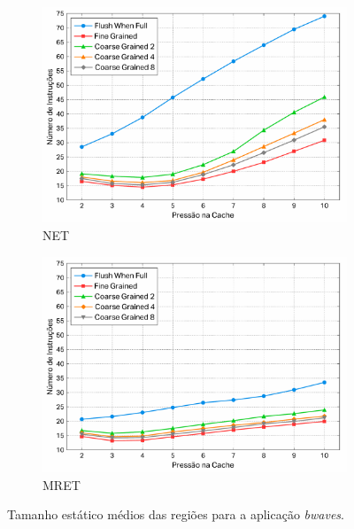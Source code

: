 \documentclass[12pt,twoside]{article}
\begin{document}
\begin{figure}[!ht]
        \centering
        \begin{subfigure}[b]{0.45\textwidth}
                \includegraphics[width=\textwidth]{./figs/net-bwaves-average-reg-size}
                \caption{NET}
                \label{fig-net-bwaves-average-reg-size}
        \end{subfigure}
        \quad %
                \begin{subfigure}[b]{0.45\textwidth}
                \includegraphics[width=\textwidth]{./figs/mret-bwaves-average-reg-size}
                \caption{MRET}
                \label{fig-mret-bwaves-average-reg-size}
        \end{subfigure}
\caption{Tamanho estático médios das regiões para a aplicação \emph{bwaves}.}
\end{figure}
\end{document}

